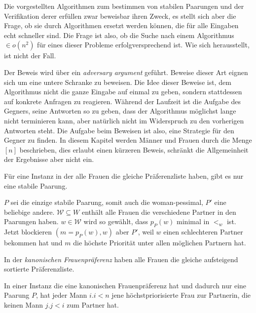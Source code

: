 Die vorgestellten Algorithmen zum bestimmen von stabilen Paarungen und der Verifikation derer erfüllen zwar beweisbar ihren Zweck, es stellt sich aber die Frage, ob sie durch Algorithmen ersetzt werden können, die für alle Eingaben echt schneller sind. Die Frage ist also, ob die Suche nach einem Algorithmus $\in o(n^2)$ für eines dieser Probleme erfolgversprechend ist. Wie sich herausstellt, ist nicht der Fall.\par

Der Beweis wird über ein \textit{adversary argument} geführt. Beweise dieser Art eignen sich um eine untere Schranke zu beweisen. Die Idee dieser Beweise ist, dem Algorithmus nicht die ganze Eingabe auf einmal zu geben, sondern stattdessen auf konkrete Anfragen zu reagieren. Während der Laufzeit ist die Aufgabe des Gegners, seine Antworten so zu geben, dass der Algorithmus möglichst lange nicht terminieren kann, aber natürlich nicht im Widerspruch zu den vorherigen Antworten steht. Die Aufgabe beim Beweisen ist also, eine Strategie für den Gegner zu finden. In diesem Kapitel werden Männer und Frauen durch die Menge $[n]$ beschrieben, dies erlaubt einen kürzeren Beweis, schränkt die Allgemeinheit der Ergebnisse aber nicht ein.\par

\begin{Lemma}
\label{eine_paarung}
  Für eine Instanz in der alle Frauen die gleiche Präferenzliste haben, gibt es nur eine stabile Paarung.
\end{Lemma}

\begin{Beweis}
\label{eine_paarung_bew}
  $P$ sei die einzige stabile Paarung, somit auch die woman-pessimal, $P'$ eine beliebige andere. $\mathcal{W} \subseteq W$ enthält alle Frauen die verschiedene Partner in den Paarungen haben. $w \in \mathcal{W}$ wird so gewählt, dass $p_{P}(w)$ minimal in $<_{w}$ ist. Jetzt blockieren $(m = p_{P}(w),w)$ aber $P'$, weil $w$ einen schlechteren Partner bekommen hat und $m$ die höchste Priorität unter allen möglichen Partnern hat.
\end{Beweis}

\begin{Definition}
\label{kanonische_listen}
  In der \textit{kanonischen Frauenpräferenz} haben alle Frauen die gleiche aufsteigend sortierte Präferenzliste.
\end{Definition}

\begin{Lemma}
\label{beste_frau}
  In einer Instanz die eine kanonischen Frauenpräferenz hat und dadurch nur eine Paarung $P$, hat jeder Mann $i.i<n$ jene höchstpriorisierte Frau zur Partnerin, die keinen Mann $j.j<i$ zum Partner hat.
\end{Lemma}

